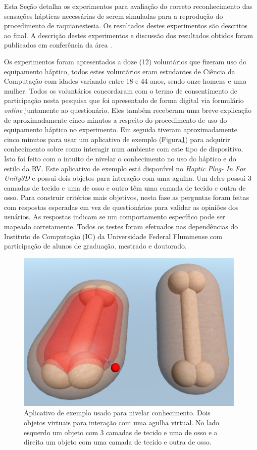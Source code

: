 Esta Seção detalha os experimentos para avaliação do correto reconhecimento das sensações hápticas necessárias de serem simuladas para a reprodução do procedimento de raquianestesia. Os resultados destes experimentos são descritos ao final. A descrição destes experimentos e discussão dos resultados obtidos foram publicados em conferência da área \cite{Melo2021}. 

Os experimentos foram apresentados a doze (12) voluntários que fizeram uso do equipamento háptico, todos estes voluntários eram estudantes de Ciência da Computação com idades variando entre 18 e 44 anos, sendo onze homens e uma mulher. Todos os voluntários concordaram com o termo de consentimento de participação nesta pesquisa que foi apresentado de forma digital via formulário \textit{online} juntamente ao questionário. Eles também receberam uma breve explicação de aproximadamente cinco minutos a respeito do procedimento de uso do equipamento háptico no experimento. Em seguida tiveram aproximadamente cinco minutos para usar um aplicativo de exemplo (Figura\ref{fig:aplicativoExemplo}) para adquirir conhecimento sobre como interagir num ambiente com este tipo de dispositivo. Isto foi feito com o intuito de nivelar o conhecimento no uso do háptico e do estilo da \acrshort{RV}. Este aplicativo de exemplo está disponível no \textit{Haptic Plug-
In For Unity3D} \cite{Poyade2014} e possui dois objetos para interação com uma agulha. Um deles possui 3 camadas de tecido e uma de osso e outro têm uma camada de tecido e outra de osso. Para construir critérios mais objetivos, nesta fase as perguntas foram feitas com respostas esperadas em vez de questionários para validar as opiniões dos usuários. As respostas indicam se um comportamento específico pode ser mapeado corretamente.
Todos os testes foram efetuados
nas dependências do Instituto de Computação (IC) da Universidade Federal Fluminense com participação de alunos de graduação, mestrado e doutorado.

\begin{figure}[ht!]
    \centering
    \includegraphics[width=0.6\linewidth]{capitulos/figuras/aplicativo-exemplo.png} 
    \caption{Aplicativo de exemplo usado para nivelar conhecimento. Dois objetos virtuais para interação com uma agulha virtual. No lado esquerdo um objeto com 3 camadas de tecido e uma de osso e a direita um objeto com uma camada de tecido e outra de osso.}
    \label{fig:aplicativoExemplo}
\end{figure}



